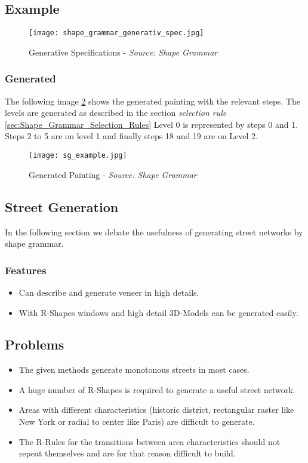 \subsection{Example}
\begin{figure}[!h]
    \centering
    \texttt{[image: shape\_grammar\_generativ\_spec.jpg]}
    \caption{Generative Specifications - \textit{Source: Shape Grammar} \citep{shapeGrammars:1972}}
    \label{fig:shape_grammar_gen_specifications}
\end{figure}
\pagebreak
\subsubsection{Generated}
The following image \ref{fig:Shape Grammars/Example} shows the generated painting with the relevant steps. The levels are generated as described in the section \textit{selection rule} \ref{sec:Shape_Grammar_Selection_Rules} 
\newline
Level 0 is represented by steps 0 and 1. Steps 2 to 5 are on level 1 and finally steps 18 and 19 are on Level 2.
\begin{figure}[!h]
    \centering
    \texttt{[image: sg\_example.jpg]}
    \caption{ Generated Painting - \textit{Source: Shape Grammar} \citep{shapeGrammars:1972}}
    \label{fig:Shape Grammars/Example}
\end{figure}

\newpage
\subsection{Street Generation}
In the following section we debate the usefulness of generating street networks by shape grammar. 
\subsubsection{Features}
\begin{itemize}
    \item Can describe and generate veneer in high details.
    \item With R-Shapes windows and high detail 3D-Models can be generated easily.
\end{itemize}

\subsection{Problems}
\begin{itemize}
    \item The given methods generate monotonous streets in most cases. 
    \item A huge number of R-Shapes is required to generate a useful street network.
    \item Areas with different characteristics (historic district, rectangular raster like New York or radial to center like Paris) are difficult to generate.
    \item The R-Rules for the transitions between area characteristics should not repeat themselves and are for that reason difficult to build.
\end{itemize}

